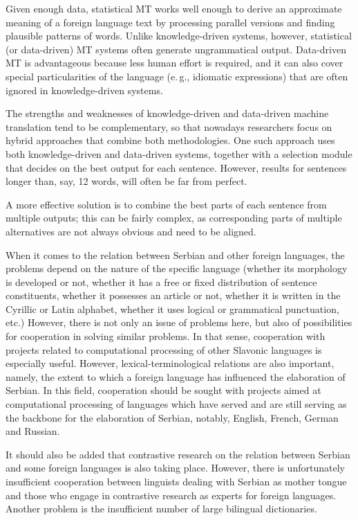 \begin{multicols}{2}
Given enough data, statistical MT works well enough to derive an approximate meaning of a foreign language text by processing parallel versions and finding plausible patterns of words. Unlike knowledge-driven systems, however, statistical (or data-driven) MT systems often generate ungrammatical output. Data-driven MT is advantageous because less human effort is required, and it can also cover special particularities of the language (e.\,g., idiomatic expressions) that are often ignored in knowledge-driven systems. 

The strengths and weaknesses of knowledge-driven and data-driven machine translation tend to be complementary, so that nowadays researchers focus on hybrid approaches that combine both methodologies. One such approach uses both knowledge-driven and data-driven systems, together with a selection module that decides on the best output for each sentence. However, results for sentences longer than, say, 12 words, will often be far from perfect. 

A more effective solution is to combine the best parts of each sentence from multiple outputs; this can be fairly complex, as corresponding parts of multiple alternatives are not always obvious and need to be aligned. 


When it comes to the relation between Serbian and other foreign languages, the problems depend on the nature of the specific language (whether its morphology is developed or not, whether it has a free or fixed distribution of sentence constituents, whether it possesses an article or not, whether it is written in the Cyrillic or Latin alphabet, whether it uses logical or grammatical punctuation, etc.) However, there is not only an issue of problems here, but also of possibilities for cooperation in solving similar problems. In that sense, cooperation with projects related to computational processing of other Slavonic languages is especially useful. However, lexical-terminological relations are also important, namely, the extent to which a foreign language has influenced the elaboration of Serbian. In this field, cooperation should be sought with projects aimed at computational processing of languages which have served and are still serving as the backbone for the elaboration of Serbian, notably, English, French, German and Russian.

It should also be added that contrastive research on the relation between Serbian and some foreign languages is also taking place. However, there is unfortunately insufficient cooperation between linguists dealing with Serbian as mother tongue and those who engage in contrastive research as experts for foreign languages. Another problem is the insufficient number of large bilingual dictionaries. 


\end{multicols}
